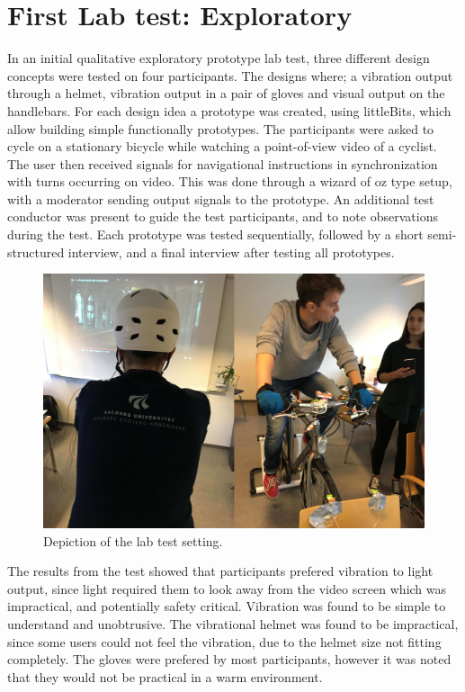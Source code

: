 \documentclass{sigchi}
\begin{document}
\section{First Lab test: Exploratory}
In an initial qualitative exploratory prototype lab test, three different design concepts were tested on four participants. The designs where; a vibration output through a helmet, vibration output in a pair of gloves and visual output on the handlebars. 
For each design idea a prototype was created, using littleBits, which allow building simple functionally prototypes. The participants were asked to cycle on a stationary bicycle while watching a point-of-view video of a cyclist. The user then received signals for navigational instructions in synchronization with turns occurring on video. This was done through a wizard of oz type setup, with a moderator sending output signals to the prototype. An additional test conductor was present to guide the test participants, and to note observations during the test. Each prototype was tested sequentially, followed by a short semi-structured interview, and a final interview after testing all prototypes.
\begin{figure}
\centering
\includegraphics[width=0.9\columnwidth]{figures/eval1_setup.jpg}
\caption{Depiction of the lab test setting.}
\label{fig:eval1_setup}
\end{figure}
The results from the test showed that participants prefered vibration to light output, since light required them to look away from the video screen which was impractical, and potentially safety critical. Vibration was found to be simple to understand and unobtrusive. The vibrational helmet was found to be impractical, since some users could not feel the vibration, due to the helmet size not fitting completely. The gloves were prefered by most participants, however it was noted that they would not be practical in a warm environment.
\end{document}
